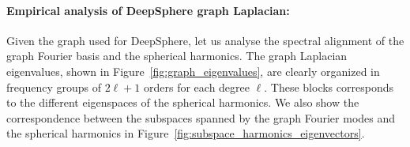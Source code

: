 \documentclass{article} %
\newtheorem{theorem}{Theorem}
\newcommand{\figref}[1]{Figure~\ref{fig:#1}}
\renewcommand{\b}[1]{{\bm{#1}}}   %
\newcommand{\1}{\b{1}}              %
\newcommand{\0}{\b{0}}              %
\renewcommand{\L}{\b{L}}
\newcommand{\U}{\b{U}}
\begin{document}



\paragraph{Empirical analysis of DeepSphere graph Laplacian:} 
Given the graph used for DeepSphere, let us analyse the spectral alignment of the graph Fourier basis and the spherical harmonics.
The graph Laplacian eigenvalues, shown in \figref{graph_eigenvalues}, are clearly organized in frequency groups of $2\ell + 1$ orders for each degree $\ell$.
These blocks corresponds to the different eigenspaces of the spherical harmonics.
We also show the correspondence between the subspaces spanned by the graph Fourier modes and the spherical harmonics in \figref{subspace_harmonics_eigenvectors}.
\end{document}
